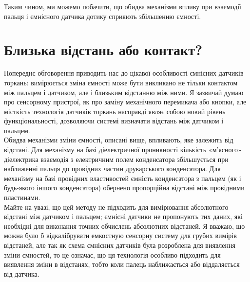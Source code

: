 \documentclass[a4paper,fontsize=12]{report}
\begin{document}
  Таким чином, ми можемо побачити, що обидва механізми впливу при взаємодії пальця і ємнісного датчика дотику сприяють збільшенню ємності.
\section{Близька відстань або контакт?}
  
  Попереднє обговорення приводить нас до цікавої особливості ємнісних датчиків торкань: вимірюється зміна ємності може бути викликано не тільки контактом між пальцем і датчиком, але і близьким відстанню між ними. Я зазвичай думаю про сенсорному пристрої, як про заміну механічного перемикача або кнопки, але місткість технологія датчиків торкань насправді являє собою новий рівень функціональності, дозволяючи системі визначати відстань між датчиком і пальцем.\\

  Обидва механізми зміни ємності, описані вище, впливають, яке залежить від відстані. Для механізму на базі діелектричної проникності кількість «м'ясного» діелектрика взаємодія з електричним полем конденсатора збільшується при наближенні пальця до провідних частин друкарського конденсатора. Для механізму на базі провідних властивостей ємність конденсатора з пальцем (як і будь-якого іншого конденсатора) обернено пропорційна відстані між провідними пластинами.\\

  Майте на увазі, що цей методу не підходить для вимірювання абсолютного відстані між датчиком і пальцем; ємнісні датчики не пропонують тих даних, які необхідні для виконання точних обчислень абсолютних відстаней. Я вважаю, що можна було б відкалібрувати емкостную сенсорну систему для грубих вимірів відстаней, але так як схема ємнісних датчиків була розроблена для виявлення зміни ємностей, то це означає, що ця технологія особливо підходить для виявлення зміни в відстанях, тобто коли палець наближається або віддаляється від датчика.
\end{document}
